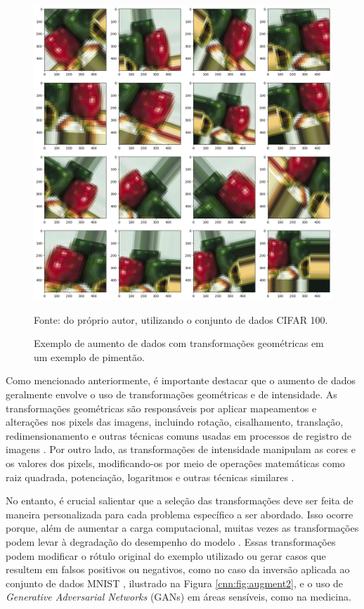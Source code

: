 \begin{figure}[H]
    \centering
    \caption{Exemplo de aumento de dados com transformações geométricas em um exemplo de pimentão.}
    \includegraphics[width=1\linewidth]{recursos/imagens/deep/dataaugmentation.png}
    \label{cnn:fig:augment}

     Fonte: do próprio autor, utilizando o conjunto de dados CIFAR 100\citep{Bossard2014Food-101Forests}.
\end{figure}

Como mencionado anteriormente, é importante destacar que o aumento de dados geralmente envolve o uso de transformações geométricas e de intensidade. As transformações geométricas são responsáveis por aplicar mapeamentos e alterações nos pixels das imagens, incluindo rotação, cisalhamento, translação, redimensionamento e outras técnicas comuns usadas em processos de registro de imagens \citep{pedrini2008analise}. Por outro lado, as transformações de intensidade manipulam as cores e os valores dos pixels, modificando-os por meio de operações matemáticas como raiz quadrada, potenciação, logaritmos e outras técnicas similares \citep{pedrini2008analise}.

No entanto, é crucial salientar que a seleção das transformações deve ser feita de maneira personalizada para cada problema específico a ser abordado. Isso ocorre porque, além de aumentar a carga computacional, muitas vezes as transformações podem levar à degradação do desempenho do modelo \citep{Carneiro2021EfficientProcessing, Hyttinen2020}. Essas transformações podem modificar o rótulo original do exemplo utilizado ou gerar casos que resultem em falsos positivos ou negativos, como no caso da inversão aplicada ao conjunto de dados MNIST \citep{LeCun2010MNISTDatabase}, ilustrado na Figura \ref{cnn:fig:augment2}, e o uso de \textit{Generative Adversarial Networks} (GANs) em áreas sensíveis, como na medicina.

